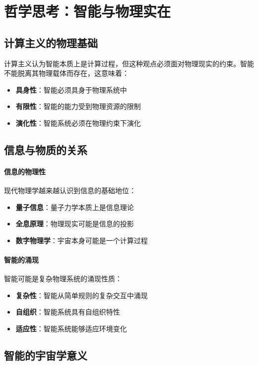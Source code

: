 \section{哲学思考：智能与物理实在}

\subsection{计算主义的物理基础}

计算主义认为智能本质上是计算过程，但这种观点必须面对物理现实的约束。智能不能脱离其物理载体而存在，这意味着：

\begin{itemize}
\item \textbf{具身性}：智能必须具身于物理系统中
\item \textbf{有限性}：智能的能力受到物理资源的限制
\item \textbf{演化性}：智能系统必须在物理约束下演化
\end{itemize}

\subsection{信息与物质的关系}

\paragraph{信息的物理性}
现代物理学越来越认识到信息的基础地位：
\begin{itemize}
\item \textbf{量子信息}：量子力学本质上是信息理论
\item \textbf{全息原理}：物理现实可能是信息的投影
\item \textbf{数字物理学}：宇宙本身可能是一个计算过程
\end{itemize}

\paragraph{智能的涌现}
智能可能是复杂物理系统的涌现性质：
\begin{itemize}
\item \textbf{复杂性}：智能从简单规则的复杂交互中涌现
\item \textbf{自组织}：智能系统具有自组织特性
\item \textbf{适应性}：智能系统能够适应环境变化
\end{itemize}

\subsection{智能的宇宙学意义}

